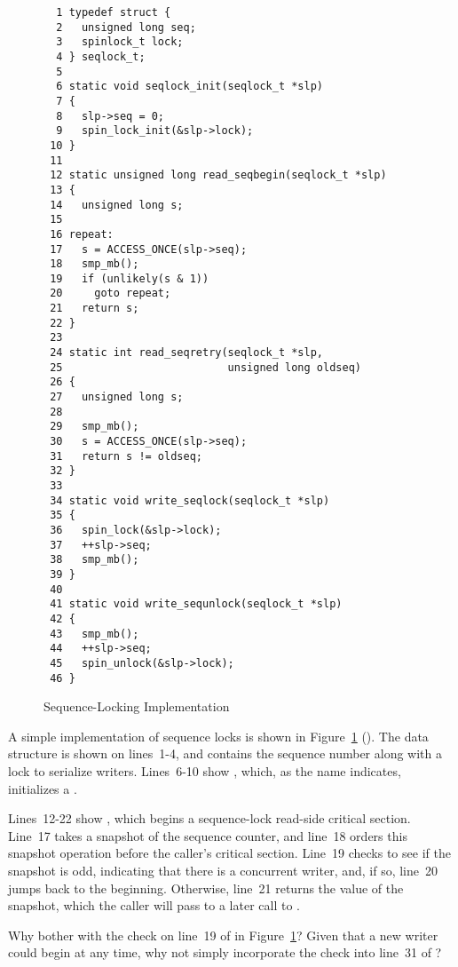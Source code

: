 \begin{figure}[bp]
{ \scriptsize
\begin{verbatim}
  1 typedef struct {
  2   unsigned long seq;
  3   spinlock_t lock;
  4 } seqlock_t;
  5 
  6 static void seqlock_init(seqlock_t *slp)
  7 {
  8   slp->seq = 0;
  9   spin_lock_init(&slp->lock);
 10 }
 11 
 12 static unsigned long read_seqbegin(seqlock_t *slp)
 13 {
 14   unsigned long s;
 15 
 16 repeat:
 17   s = ACCESS_ONCE(slp->seq);
 18   smp_mb();
 19   if (unlikely(s & 1))
 20     goto repeat;
 21   return s;
 22 }
 23 
 24 static int read_seqretry(seqlock_t *slp,
 25                          unsigned long oldseq)
 26 {
 27   unsigned long s;
 28 
 29   smp_mb();
 30   s = ACCESS_ONCE(slp->seq);
 31   return s != oldseq;
 32 }
 33 
 34 static void write_seqlock(seqlock_t *slp)
 35 {
 36   spin_lock(&slp->lock);
 37   ++slp->seq;
 38   smp_mb();
 39 }
 40 
 41 static void write_sequnlock(seqlock_t *slp)
 42 {
 43   smp_mb();
 44   ++slp->seq;
 45   spin_unlock(&slp->lock);
 46 }
\end{verbatim}
}
\caption{Sequence-Locking Implementation}
\label{fig:defer:Sequence-Locking Implementation}
\end{figure}

A simple implementation of sequence locks is shown in
Figure~\ref{fig:defer:Sequence-Locking Implementation}
().
The  data structure is shown on lines~1-4, and contains
the sequence number along with a lock to serialize writers.
Lines~6-10 show , which, as the name indicates,
initializes a .

Lines~12-22 show , which begins a sequence-lock
read-side critical section.
Line~17 takes a snapshot of the sequence counter, and line~18 orders
this snapshot operation before the caller's critical section.
Line~19 checks to see if the snapshot is odd, indicating that there
is a concurrent writer, and, if so, line~20 jumps back to the beginning.
Otherwise, line~21 returns the value of the snapshot, which the caller
will pass to a later call to .

\QuickQuiz{}
	Why bother with the check on line~19 of
	 in
	Figure~\ref{fig:defer:Sequence-Locking Implementation}?
	Given that a new writer could begin at any time, why not
	simply incorporate the check into line~31 of
	?
 \QuickQuizEnd

